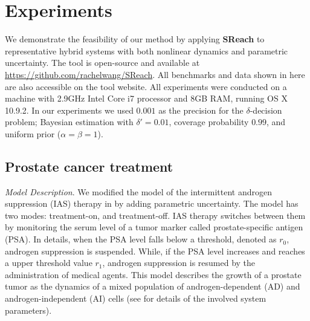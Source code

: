 \section{Experiments}


We demonstrate the feasibility of our method by applying {\bf SReach} to representative hybrid systems with both nonlinear dynamics and parametric uncertainty. 
The tool is open-source and available at \url{https://github.com/rachelwang/SReach}. 
All benchmarks and data shown in here are also accessible on the tool website. All experiments were conducted on a machine with 2.9GHz Intel Core i7 processor and 8GB RAM, running OS X 10.9.2. 
In our experiments we used $0.001$ as the precision for the $\delta$-decision problem; Bayesian estimation
with $\delta' = 0.01$, coverage probability $0.99$, and uniform prior ($\alpha = \beta = 1$). 


\subsection{Prostate cancer treatment}

\textit{Model Description}.
We modified the model of the intermittent androgen suppression (IAS) therapy in \cite{tanaka2010mathematical} by adding parametric uncertainty. The model has two modes: treatment-on, and treatment-off. IAS therapy switches between them by monitoring the serum level of a tumor marker called prostate-specific antigen (PSA). In details, when the PSA level falls below a threshold, denoted as $r_0$, androgen suppression is suspended. While, if the PSA level increases and reaches a upper threshold value $r_1$, androgen suppression is resumed by the administration of medical agents. This model describes the growth of a prostate tumor as the dynamics of a mixed population of androgen-dependent (AD) and androgen-independent (AI) cells (see \cite{tanaka2010mathematical} for details of the involved system parameters). 

